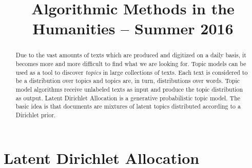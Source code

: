 \documentclass[a4paper,ngerman, english]{atseminar}
\title{Algorithmic Methods in the Humanities – Summer 2016}
\author{}
\begin{document}
\newcommand{\ed}{\textcolor{Blue}}

\maketitle

\ENGLISH

\section{Latent Dirichlet Allocation}


\begin{abstract}
Due to the vast amounts of texts which are produced and digitized on a daily basis, it 
becomes more and more difficult to find what we are looking for. Topic models can 
be used as a tool to discover \textit{topics} in large collections of texts. Each text 
is considered to be a distribution over topics and topics are, in turn, distributions over
words. Topic model algorithms receive unlabeled texts as input and produce the topic 
distribution as output. 
Latent Dirichlet Allocation is a generative probabilistic topic model. The basic idea is
that documents are mixtures of latent topics distributed according to a Dirichlet prior.


\end{abstract}
\end{document}
